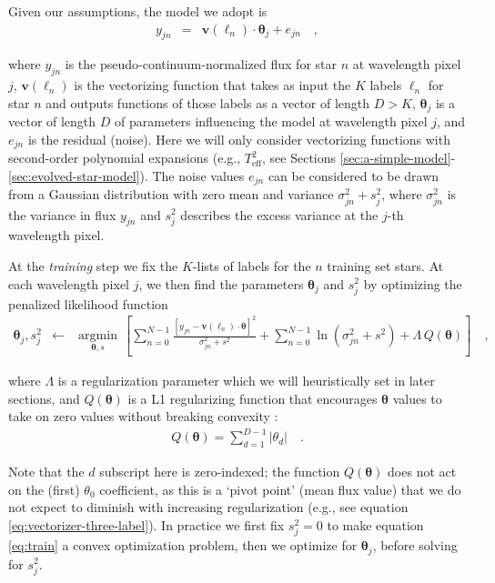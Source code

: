 \documentclass[preprint,trackchanges]{aastex}
\newcommand{\teff}{T_{\mathrm{eff}}}
\newcommand{\Dvector}[1]{\boldsymbol{#1}}
\newcommand{\vectheta}{\Dvector{\theta}}
\newcommand{\vecv}{\Dvector{v}}
\newcommand{\argmin}[1]{\underset{#1}{\operatorname{argmin}}\,}
\begin{document}
\noindent{}Given our assumptions, the model we adopt is
\begin{eqnarray}\label{eq:model}
y_{jn} & = & \vecv(\ell_n)\cdot\vectheta_j + e_{jn}\quad ,
\end{eqnarray}

\noindent{}where $y_{jn}$ is the pseudo-continuum-normalized flux for star $n$ at wavelength pixel
$j$, $\vecv(\ell_n)$ is the vectorizing function that takes as input the $K$ labels
$\ell_n$ for star $n$ and outputs functions of those labels as a vector of length
$D>K$, $\vectheta_j$ is a vector of length $D$ of parameters influencing the model at
wavelength pixel $j$, and $e_{jn}$ is the residual (noise).  Here we will only consider
vectorizing functions with second-order polynomial expansions (e.g., $\teff^2$, see Sections 
\ref{sec:a-simple-model}-\ref{sec:evolved-star-model}).  The noise values $e_{jn}$ can 
be considered to be drawn from a Gaussian distribution with zero mean and variance 
$\sigma_{jn}^2 + s_j^2$, where $\sigma_{jn}^2$ is the variance in flux $y_{jn}$ and 
$s_j^2$ describes the excess variance at the $j$-th wavelength pixel. 


At the \emph{training} step we fix the $K$-lists of labels for the $n$ training set stars.
At each wavelength pixel $j$, we then find the parameters $\vectheta_j$ and $s_j^2$
by optimizing the penalized likelihood function
\begin{eqnarray}\label{eq:train}
\vectheta_j,s^2_j &\leftarrow& \argmin{\vectheta,s}\left[
    \sum_{n=0}^{N-1} \frac{[y_{jn}-\vecv(\ell_n)\cdot\vectheta]^2}{\sigma^2_{jn}+s^2}
    + \sum_{n=0}^{N-1} \ln(\sigma^2_{jn}+s^2) + \Lambda{}\,Q(\vectheta)
    \right]
  \quad ,
\end{eqnarray}

\noindent{}where $\Lambda$ is a regularization parameter which we will heuristically set
in later sections, and $Q(\vectheta)$ is a L1 regularizing function that encourages 
$\vectheta$ values to take on zero values without breaking convexity \citep{Casey_2016b}:
\begin{eqnarray}\label{eq:regularization-function}
	Q(\vectheta) = \sum_{d=1}^{D-1} |{\theta_d}| \quad .
\end{eqnarray}

Note that the $d$ subscript here is zero-indexed; the function $Q(\vectheta)$ does not act
on the (first) $\theta_0$ coefficient, as this is a `pivot point' (mean flux value) that 
we do not expect to diminish with increasing regularization (e.g., see equation 
\ref{eq:vectorizer-three-label}).  In practice we first fix $s_j^2 = 0$ to make equation
\ref{eq:train} a convex optimization problem, then we optimize for $\vectheta_j$, before 
solving for $s_j^2$.  
\end{document}
